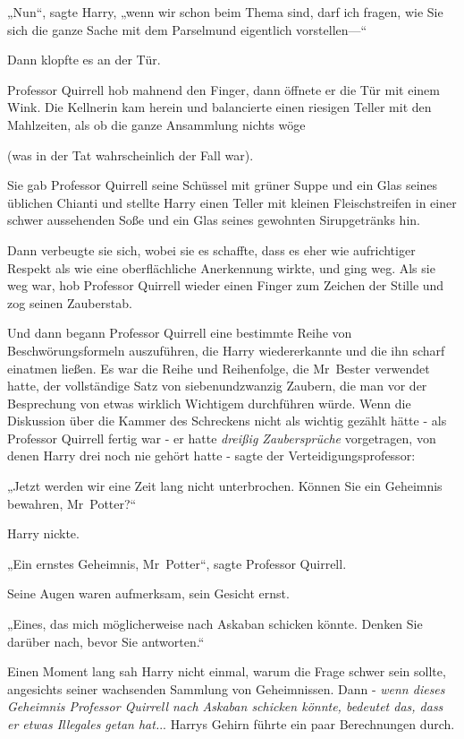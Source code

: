 {„Nun“, sagte Harry, „wenn wir schon beim Thema sind, darf ich fragen, wie Sie sich die ganze Sache mit dem Parselmund eigentlich vorstellen—“

Dann klopfte es an der Tür.

Professor Quirrell hob mahnend den Finger, dann öffnete er die Tür mit einem Wink. Die Kellnerin kam herein und balancierte einen riesigen Teller mit den Mahlzeiten, als ob die ganze Ansammlung nichts wöge

(was in der Tat wahrscheinlich der Fall war).

Sie gab Professor Quirrell seine Schüssel mit grüner Suppe und ein Glas seines üblichen Chianti und stellte Harry einen Teller mit kleinen Fleischstreifen in einer schwer aussehenden Soße und ein Glas seines gewohnten Sirupgetränks hin.

Dann verbeugte sie sich, wobei sie es schaffte, dass es eher wie aufrichtiger Respekt als wie eine oberflächliche Anerkennung wirkte, und ging weg. Als sie weg war, hob Professor Quirrell wieder einen Finger zum Zeichen der Stille und zog seinen Zauberstab.

Und dann begann Professor Quirrell eine bestimmte Reihe von Beschwörungsformeln auszuführen, die Harry wiedererkannte und die ihn scharf einatmen ließen. Es war die Reihe und Reihenfolge, die Mr~Bester verwendet hatte, der vollständige Satz von siebenundzwanzig Zaubern, die man vor der Besprechung von etwas wirklich Wichtigem durchführen würde. Wenn die Diskussion über die Kammer des Schreckens nicht als wichtig gezählt hätte - als Professor Quirrell fertig war - er hatte \emph{dreißig Zaubersprüche} vorgetragen, von denen Harry drei noch nie gehört hatte - sagte der Verteidigungsprofessor:

„Jetzt werden wir eine Zeit lang nicht unterbrochen. Können Sie ein Geheimnis bewahren, Mr~Potter?“

Harry nickte.

„Ein ernstes Geheimnis, Mr~Potter“, sagte Professor Quirrell.

Seine Augen waren aufmerksam, sein Gesicht ernst.

„Eines, das mich möglicherweise nach Askaban schicken könnte. Denken Sie darüber nach, bevor Sie antworten.“

Einen Moment lang sah Harry nicht einmal, warum die Frage schwer sein sollte, angesichts seiner wachsenden Sammlung von Geheimnissen. Dann - \emph{wenn dieses Geheimnis Professor Quirrell nach Askaban schicken könnte, bedeutet das, dass er etwas Illegales getan hat.}.. Harrys Gehirn führte ein paar Berechnungen durch.

}

